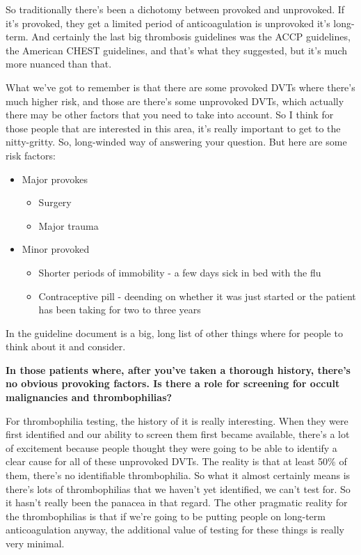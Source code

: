 \documentclass[
]{book}
\begin{document}
So traditionally there's been a dichotomy between provoked and
unprovoked. If it's provoked, they get a limited period of
anticoagulation is unprovoked it's long-term. And certainly the last big
thrombosis guidelines was the ACCP guidelines, the American CHEST
guidelines, and that's what they suggested, but it's much more nuanced
than that.

What we've got to remember is that there are some provoked DVTs where
there's much higher risk, and those are there's some unprovoked DVTs,
which actually there may be other factors that you need to take into
account. So I think for those people that are interested in this area,
it's really important to get to the nitty-gritty. So, long-winded way of
answering your question. But here are some risk factors:

\begin{itemize}
\item
  Major provokes

  \begin{itemize}
  \item
    Surgery
  \item
    Major trauma
  \end{itemize}
\item
  Minor provoked

  \begin{itemize}
  \item
    Shorter periods of immobility - a few days sick in bed with the
    flu
  \item
    Contraceptive pill - deending on whether it was just started or
    the patient has been taking for two to three years
  \end{itemize}
\end{itemize}

In the guideline document is a big, long list of other things where for
people to think about it and consider.

\textbf{In those patients where, after you've taken a thorough history,
there's no obvious provoking factors. Is there a role for screening for
occult malignancies and thrombophilias?}

For thrombophilia testing, the history of it is really interesting. When
they were first identified and our ability to screen them first became
available, there's a lot of excitement because people thought they were
going to be able to identify a clear cause for all of these unprovoked
DVTs. The reality is that at least 50\% of them, there's no identifiable
thrombophilia. So what it almost certainly means is there's lots of
thrombophilias that we haven't yet identified, we can't test for. So it
hasn't really been the panacea in that regard. The other pragmatic
reality for the thrombophilias is that if we're going to be putting
people on long-term anticoagulation anyway, the additional value of
testing for these things is really very minimal.
\end{document}
